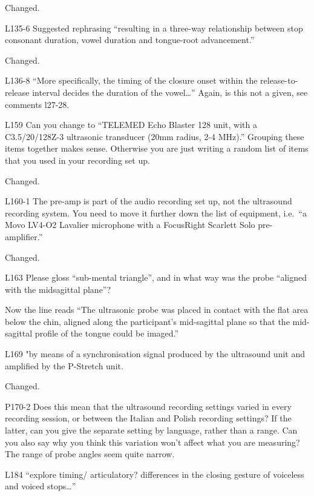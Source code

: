 \documentclass[]{article}
\begin{document}
Changed. \color{black}

L135-6 Suggested rephrasing ``resulting in a three-way relationship
between stop consonant duration, vowel duration and tongue-root
advancement.''

\color{plum}

Changed. \color{black}

L136-8 ``More specifically, the timing of the closure onset within the
release-to-release interval decides the duration of the vowel\ldots{}''
Again, is this not a given, see comments l27-28.

L159 Can you change to ``TELEMED Echo Blaster 128 unit, with a
C3.5/20/128Z-3 ultrasonic transducer (20mm radius, 2-4 MHz).'' Grouping
these items together makes sense. Otherwise you are just writing a
random list of items that you used in your recording set up.

\color{plum}

Changed. \color{black}

L160-1 The pre-amp is part of the audio recording set up, not the
ultrasound recording system. You need to move it further down the list
of equipment, i.e.~``a Movo LV4-O2 Lavalier microphone with a FocusRight
Scarlett Solo pre-amplifier.''

\color{plum}

Changed. \color{black}

L163 Please gloss ``sub-mental triangle'', and in what way was the probe
``aligned with the midsagittal plane''?

\color{plum}

Now the line reads ``The ultrasonic probe was placed in contact with the
flat area below the chin, aligned along the participant's mid-sagittal
plane so that the mid-sagittal profile of the tongue could be imaged.''
\color{black}

L169 "by means of a synchronisation signal produced by the ultrasound
unit and amplified by the P-Stretch unit.

\color{plum}

Changed. \color{black}

P170-2 Does this mean that the ultrasound recording settings varied in
every recording session, or between the Italian and Polish recording
settings? If the latter, can you give the separate setting by language,
rather than a range. Can you also say why you think this variation won't
affect what you are measuring? The range of probe angles seem quite
narrow.

L184 ``explore timing/ articulatory? differences in the closing gesture
of voiceless and voiced stops\ldots{}''
\end{document}
